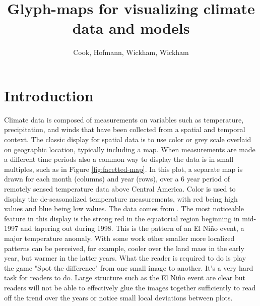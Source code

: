 \documentclass[oneside]{article}
\begin{document}
\title{Glyph-maps for visualizing climate data and models}
\author{Cook, Hofmann, Wickham, Wickham}


%
%
\maketitle

\section{Introduction}

Climate data is composed of measurements on variables such as temperature, precipitation, and winds that have been collected from a spatial and temporal context. The classic display for spatial data is to use color or grey scale overlaid on geographic location, typically including a map. When measurements are made a different time periods also a common way to display the data is in small multiples, such as in Figure \ref{fig:facetted-map}. In this plot, a separate map is drawn for each month (columns) and year (rows), over a 6 year period of remotely sensed temperature data above Central America. Color is used to display the de-seasonalized temperature measurements, with red being high values and blue being low values. The data  comes from \cite{NASA-Data-Expo}. The most noticeable feature in this display is the strong red in the equatorial region beginning in mid-1997 and tapering out during 1998. This is the pattern of an El Ni\~no event, a major temperature anomaly. With some work other smaller more localized patterns can be perceived, for example, cooler over the land mass in the early year, but warmer in the latter years. What the reader is required to do is play the game "Spot the difference" from one small image to another. It's a very hard task for readers to do. Large structure such as the El Ni\~no event are clear but readers will not be able to effectively glue the images together sufficiently to read off the trend over the years or notice small local deviations between plots.
\end{document}
